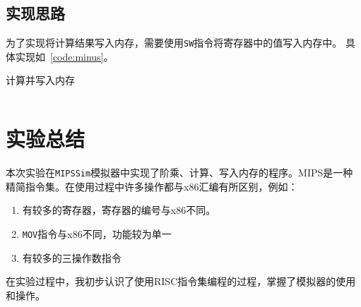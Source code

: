 \documentclass[a4paper,twoside]{article}
\begin{document}
\begin{spacing}{1.2}
\subsection{实现思路}

为了实现将计算结果写入内存，需要使用\texttt{SW}指令将寄存器中的值写入内存中。
具体实现如~\ref{code:minus}。

\begin{listing}[htb]
	\caption{计算并写入内存}
	\label{code:minus}
	\inputminted{nasm}{code/minus.txt}
\end{listing}

\section{实验总结}

本次实验在\texttt{MIPSSim}模拟器中实现了阶乘、计算、写入内存的程序。MIPS是一种
精简指令集。在使用过程中许多操作都与x86汇编有所区别，例如：
\begin{enumerate}
	\item 有较多的寄存器，寄存器的编号与x86不同。
	\item \texttt{MOV}指令与x86不同，功能较为单一
	\item 有较多的三操作数指令
\end{enumerate}
在实验过程中，我初步认识了使用RISC指令集编程的过程，掌握了模拟器的使用和操作。

\end{spacing}
\end{document}
